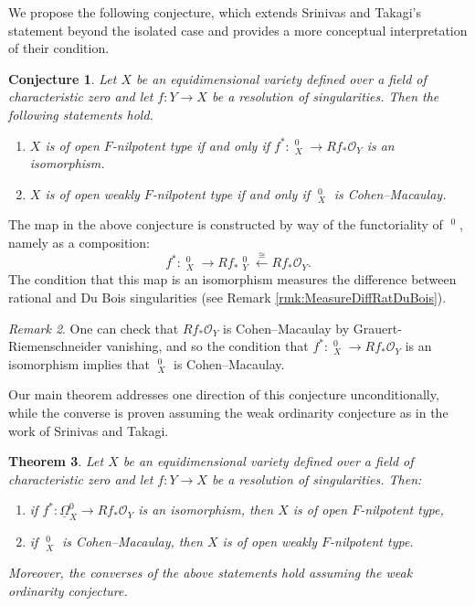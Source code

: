 \documentclass[letterpaper,11pt]{amsart}
\DeclareMathOperator{\DDB}{\underline{\Omega}}
\theoremstyle{plain}
\newtheorem{thm}{Theorem}[section]
\newtheorem{conj}[thm]{Conjecture}
\theoremstyle{definition}
\theoremstyle{remark}
\newtheorem{rmk}[thm]{Remark}
\def\cO{\mathcal{O}}
\begin{document}
We propose the following conjecture, which extends Srinivas and Takagi's statement beyond the isolated case and provides a more conceptual interpretation of their condition.

\begin{conj} \label{conj:mainintro}
Let $X$ be an equidimensional variety defined over a field of characteristic zero and let $f \colon Y \to X$ be a resolution of singularities. Then the following statements hold.

{\setlength{\leftmargini}{2em} \begin{enumerate}
\setlength\itemsep{0.1em}
\item $X$ is of open $F$-nilpotent type if and only if $f^* \colon \DDB^0_X \to Rf_*\cO_Y$ is an isomorphism.
\item $X$ is of open weakly $F$-nilpotent type if and only if $\DDB^0_X$ is Cohen--Macaulay. 
\end{enumerate}}
\end{conj}
\noindent The map in the above conjecture is constructed by way of the functoriality of $\DDB^0$, namely as a  composition:
\begin{equation} \label{eq:keymap}
f^* \colon \DDB^0_X \to Rf_*\DDB^0_Y \xleftarrow{\cong} Rf_*\cO_Y.
\end{equation}
The condition that this map is an isomorphism measures the difference between rational and Du Bois singularities (see Remark \ref{rmk:MeasureDiffRatDuBois}).
\begin{rmk} One can check that $Rf_*\cO_Y$ is Cohen--Macaulay by Grauert-Riemenschneider vanishing, and so the condition that $f^* \colon \DDB^0_X \to Rf_*\cO_Y$ is an isomorphism implies that $\DDB^0_X$ is Cohen--Macaulay.
\end{rmk}


Our main theorem addresses one direction of this conjecture unconditionally, while the converse is proven assuming the weak ordinarity conjecture as in the work of Srinivas and Takagi.

\begin{thm} \label{thm-main}
Let $X$ be an equidimensional variety defined over a field of characteristic zero and let $f \colon Y \to X$ be a resolution of singularities.  Then:

{\setlength{\leftmargini}{2em} \begin{enumerate}
\setlength\itemsep{0.1em}
\item if $f^* \colon \underline{\Omega}_X^0 \to Rf_*\cO_Y$ is an isomorphism, then $X$ is of open $F$-nilpotent type, 

\item if $\DDB^0_X$ is Cohen--Macaulay, then $X$ is of open weakly $F$-nilpotent type. 
\end{enumerate}}
\noindent Moreover, the converses of the above statements hold assuming the weak ordinarity conjecture.
\end{thm}
\end{document}
